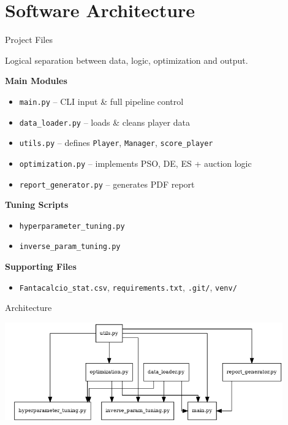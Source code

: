 \documentclass[aspectratio=169]{beamer}
\begin{document}
\section{Software Architecture}
\begin{frame}{Project Files}

	\begin{block}{}
		Logical separation between data, logic, optimization and output.
	\end{block}
		\vspace{0.3em}
		\textbf{Main Modules}
		\begin{itemize}
			\item \texttt{main.py} – CLI input \& full pipeline control
			\item \texttt{data\_loader.py} – loads \& cleans player data
			\item \texttt{utils.py} – defines \texttt{Player}, \texttt{Manager}, \texttt{score\_player}
			\item \texttt{optimization.py} – implements PSO, DE, ES + auction logic
			\item \texttt{report\_generator.py} – generates PDF report
		\end{itemize}
		\vspace{0.3em}
		\textbf{Tuning Scripts}
		\begin{itemize}
			\item \texttt{hyperparameter\_tuning.py}
			\item \texttt{inverse\_param\_tuning.py}
		\end{itemize}
		\vspace{0.3em}
		\textbf{Supporting Files}
		\begin{itemize}
			\item \texttt{Fantacalcio\_stat.csv}, \texttt{requirements.txt}, \texttt{.git/}, \texttt{venv/}
		\end{itemize}
		

\end{frame}
\begin{frame}{Architecture}


		\includegraphics[width=0.90\textwidth]{plot/architecture_diagram.png}

\end{frame}
\end{document}
